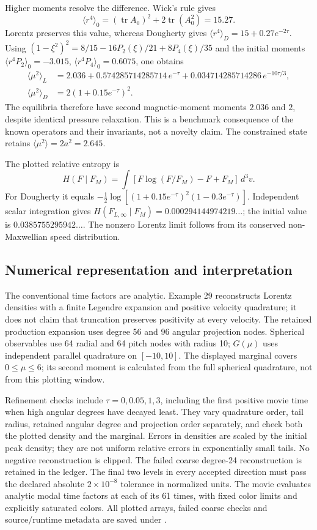 \documentclass[11pt,letterpaper]{article}
\begin{document}
Higher moments resolve the difference. Wick's rule gives
\[
 \langle r^4\rangle_0=(\operatorname{tr}A_0)^2+
 2\operatorname{tr}(A_0^2)=15.27.
\]
Lorentz preserves this value, whereas Dougherty gives
$\langle r^4\rangle_D=15+0.27e^{-2\tau}$.
Using
$(1-\xi^2)^2=8/15-16P_2(\xi)/21+8P_4(\xi)/35$ and the initial
moments $\langle r^4P_2\rangle_0=-3.015$,
$\langle r^4P_4\rangle_0=0.6075$, one obtains
\begin{align*}
 \langle\mu^2\rangle_L&=2.036+
 0.574285714285714\,e^{-\tau}+
 0.034714285714286\,e^{-10\tau/3},\\
 \langle\mu^2\rangle_D&=2(1+0.15e^{-\tau})^2.
\end{align*}
The equilibria therefore have second magnetic-moment moments $2.036$
and $2$, despite identical pressure relaxation. This is a benchmark
consequence of the known operators and their invariants, not a novelty
claim. The constrained state retains $\langle\mu^2\rangle=2a^2=2.645$.

The plotted relative entropy is
\[
 H(F\mid F_M)=\int[F\log(F/F_M)-F+F_M]\,d^3v.
\]
For Dougherty it equals
$-\tfrac12\log[(1+0.15e^{-\tau})^2(1-0.3e^{-\tau})]$.
Independent scalar integration gives
$H(F_{L,\infty}\mid F_M)=0.000294144974219\ldots$; the initial value
is $0.0385755295942\ldots$. The nonzero Lorentz limit follows from
its conserved non-Maxwellian speed distribution.

\subsection{Numerical representation and interpretation}
The conventional time factors are analytic. Example 29 reconstructs
Lorentz densities with a finite Legendre expansion and positive velocity
quadrature; it does not claim that truncation preserves positivity at
every velocity. The retained production expansion uses degree 56 and
96 angular projection nodes. Spherical observables use 64 radial and
64 pitch nodes with radius 10; $G(\mu)$ uses independent parallel
quadrature on $[-10,10]$. The displayed marginal covers $0\le\mu\le6$;
its second moment is calculated from the full spherical quadrature,
not from this plotting window.

Refinement checks include $\tau=0,0.05,1,3$, including the first positive
movie time when high angular degrees have decayed least. They vary
quadrature order, tail radius, retained angular degree and projection
order separately, and check both the plotted density and the marginal.
Errors in densities are scaled by the initial peak density; they are
not uniform relative errors in exponentially small tails. No negative
reconstruction is clipped. The failed coarse degree-24 reconstruction
is retained in the ledger. The final two levels in every accepted
direction must pass the declared absolute $2\times10^{-8}$ tolerance
in normalized units. The movie evaluates analytic modal time factors at
each of its 61 times, with fixed color limits and explicitly saturated
colors. All plotted arrays, failed coarse checks and source/runtime
metadata are saved under .
\end{document}
